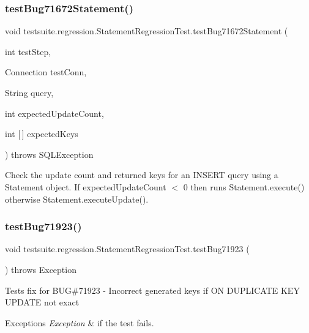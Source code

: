 \subsubsection{\texorpdfstring{test\+Bug71672\+Statement()}{testBug71672Statement()}}
{\footnotesize\ttfamily void testsuite.\+regression.\+Statement\+Regression\+Test.\+test\+Bug71672\+Statement (\begin{DoxyParamCaption}\item[{int}]{test\+Step,  }\item[{Connection}]{test\+Conn,  }\item[{String}]{query,  }\item[{int}]{expected\+Update\+Count,  }\item[{int \mbox{[}$\,$\mbox{]}}]{expected\+Keys }\end{DoxyParamCaption}) throws S\+Q\+L\+Exception}

Check the update count and returned keys for an I\+N\+S\+E\+RT query using a Statement object. If expected\+Update\+Count $<$ 0 then runs Statement.\+execute() otherwise Statement.\+execute\+Update(). \mbox{\label{classtestsuite_1_1regression_1_1_statement_regression_test_a3676f906ace9714006ad7a71ab1e4211}} 
\subsubsection{\texorpdfstring{test\+Bug71923()}{testBug71923()}}
{\footnotesize\ttfamily void testsuite.\+regression.\+Statement\+Regression\+Test.\+test\+Bug71923 (\begin{DoxyParamCaption}{ }\end{DoxyParamCaption}) throws Exception}

Tests fix for B\+UG\#71923 -\/ Incorrect generated keys if ON D\+U\+P\+L\+I\+C\+A\+TE K\+EY U\+P\+D\+A\+TE not exact


\begin{DoxyExceptions}{Exceptions}
{\em Exception} & if the test fails. \\
\hline
\end{DoxyExceptions}
\mbox{\label{classtestsuite_1_1regression_1_1_statement_regression_test_ae5f07756a16c505fbd7fb497fcf9f601}} 
